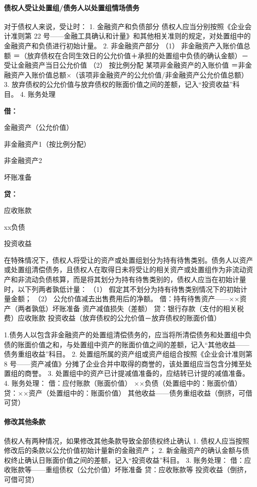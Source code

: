 \documentclass[UTF8,12pt]{ctexart}
\newenvironment{Dr}{%
	\begin{list}{}%
		{
			\setlength{\leftmargin}{2em}
			\setlength{\labelwidth}{2em}
			\setlength{\labelsep}{0pt}
			\setlength{\itemindent}{0pt}
			\setlength{\listparindent}{0pt}
			\setlength{\parsep}{0pt}
			\setlength{\topsep}{0pt}
		}
		\item[\textbf{借：}]
	}{%
	\end{list}
}
\newenvironment{Cr}{%
	\begin{list}{}%
		{
			\setlength{\leftmargin}{2em}
			\setlength{\labelwidth}{2em}
			\setlength{\labelsep}{0pt}
			\setlength{\itemindent}{0pt}
			\setlength{\listparindent}{0pt}
			\setlength{\parsep}{0pt}
			\setlength{\topsep}{0pt}
		}
		\item[\textbf{贷：}]
	}{%
	\end{list}
}
\numberwithin{equation}{section} %
\numberwithin{figure}{section}
\numberwithin{table}{section}
\begin{document}
	\paragraph{债权人受让处置组/债务人以处置组情场债务}
	对于债权人来说，受让时：
	1.	金融资产和负债部分
	债权人应当分别按照《企业会计准则第 22 号——金融工具确认和计量》和其他相关准则的规定，对处置组中的金融资产和负债进行初始计量。
	2.	非金融资产部分
	（1）	非金融资产入账价值总额
	＝（放弃债权在合同生效日的公允价值＋承担的处置组中负债的确认金额）－受让金融资产当日公允价值
	（2）	按比例分配
	某项非金融资产的入账价值
	＝非金融资产入账价值总额×（该项非金融资产的公允价值/非金融资产公允价值总额）
	3.	放弃债权的公允价值与放弃债权的账面价值之间的差额，记入“投资收益”科目。
	4.	账务处理
	\begin{Dr}
		金融资产（公允价值）
		
		非金融资产1（按比例分配）
		
		非金融资产2
		
		坏账准备
	\end{Dr}
	\begin{Cr}
		应收账款
		
		xx负债
		
		投资收益
	\end{Cr}
	
	在特殊情况下，债权人将受让的资产或处置组划分为持有待售类别。债务人以资产或处置组清偿债务，且债权人在取得日未将受让的相关资产或处置组作为非流动资产和非流动负债核算，而是将其划分为持有待售类别的，债权人应当在初始计量时，以下列两者孰低计量：
	（1）	假定其不划分为持有待售类别情况下的初始计量金额；
	（2）	公允价值减去出售费用后的净额。
	借：持有待售资产——××资产（两者孰低）坏账准备
	资产减值损失（差额）
	贷：银行存款（支付的相关税费）应收账款
	投资收益（放弃债权的公允价值－放弃债权的账面价值）
	
	1.债务人以包含非金融资产的处置组清偿债务的，应当将所清偿债务和处置组中负债的账面价值之和，与处置组中资产的账面价值之间的差额，记入“其他收益——债务重组收益”科目。
	2.	处置组所属的资产组或资产组组合按照《企业会计准则第 8 号——资产减值》分摊了企业合并中取得的商誉的，该处置组应当包含分摊至处置组的商誉。
	3.	处置组中的资产已计提减值准备的，应结转已计提的减值准备。
	4.	账务处理：
	借：应付账款（账面价值）
	××负债（处置组中的：账面价值） 贷：××资产（处置组中的：账面价值）
	其他收益——债务重组收益（倒挤，可借可贷）
	
	\paragraph{修改其他条款}
	债权人有两种情况，如果修改其他条款导致全部债权终止确认
	1.	债权人应当按照修改后的条款以公允价值初始计量新的金融资产；
	2.	新金融资产的确认金额与债权终止确认日账面价值之间的差额，记入“投资收益”科目。
	3.	账务处理：
	借：应收账款等——重组债权（公允价值）坏账准备
	贷：应收账款等
	投资收益（倒挤，可借可贷）
	
\end{document}
